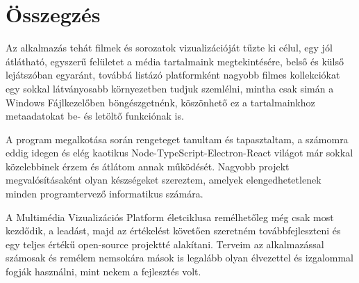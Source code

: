 \chapter{Összegzés} %
\label{ch:sum}

Az alkalmazás tehát filmek és sorozatok vizualizációját tűzte ki célul, egy jól átlátható, egyszerű felületet a média tartalmaink megtekintésére, belső és külső lejátszóban egyaránt, továbbá listázó platformként nagyobb filmes kollekciókat egy sokkal látványosabb környezetben tudjuk szemlélni, mintha csak simán a Windows Fájlkezelőben böngészgetnénk, köszönhető ez a tartalmainkhoz metaadatokat be- és letöltő funkciónak is.

A program megalkotása során rengeteget tanultam és tapasztaltam, a számomra eddig idegen és elég kaotikus Node-TypeScript-Electron-React világot már sokkal közelebbinek érzem és átlátom annak működését. Nagyobb projekt megvalósításaként olyan készségeket szereztem, amelyek elengedhetetlenek minden programtervező informatikus számára.

A Multimédia Vizualizációs Platform életciklusa remélhetőleg még csak most kezdődik, a leadást, majd az értékelést követően szeretném továbbfejleszteni és egy teljes értékű open-source projektté alakítani. Terveim az alkalmazással számosak és remélem nemsokára mások is legalább olyan élvezettel és izgalommal fogják használni, mint nekem a fejlesztés volt.
